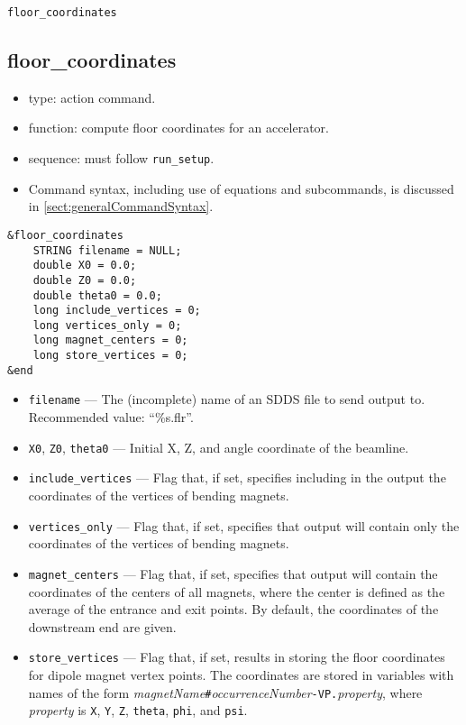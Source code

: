 \documentclass[11pt]{article}
\begin{document}
\newpage
\begin{center}{\Large\verb|floor_coordinates|}\end{center}
\subsection{floor\_coordinates \label{subsec:floorcoordinates}}

\begin{itemize}
\item type: action command.
\item function: compute floor coordinates for an accelerator.
\item sequence: must follow \verb|run_setup|.
\item Command syntax, including use of equations and subcommands, is discussed in \ref{sect:generalCommandSyntax}.
\end{itemize}

\begin{verbatim}
&floor_coordinates
    STRING filename = NULL;
    double X0 = 0.0;
    double Z0 = 0.0;
    double theta0 = 0.0;
    long include_vertices = 0;
    long vertices_only = 0;
    long magnet_centers = 0;
    long store_vertices = 0;
&end
\end{verbatim}

\begin{itemize}
\item \verb|filename| --- The (incomplete) name of an SDDS file to send output to.  
 Recommended value: ``\%s.flr''.
\item \verb|X0|, \verb|Z0|, \verb|theta0| --- Initial X, Z, and angle coordinate of the beamline.
\item \verb|include_vertices| --- Flag that, if set, specifies including  in the output
the coordinates of the vertices of bending magnets. 
\item \verb|vertices_only| --- Flag that, if set, specifies that output will contain only
the coordinates of the vertices of bending magnets. 
\item \verb|magnet_centers| --- Flag that, if set, specifies that output will contain 
the coordinates of the centers of all magnets, where the center is defined as the average of the
entrance and exit points. By default, the coordinates of the downstream
end are given.
\item \verb|store_vertices| --- Flag that, if set, results in storing the floor coordinates for
  dipole magnet vertex points. The coordinates are stored in variables with names of the form
  {\em magnetName}\verb|#|{\em occurrenceNumber}\verb|-VP.|{\em property}, where {\em property}
  is \verb|X|, \verb|Y|, \verb|Z|, \verb|theta|, \verb|phi|, and \verb|psi|.
\end{itemize}
\end{document}
